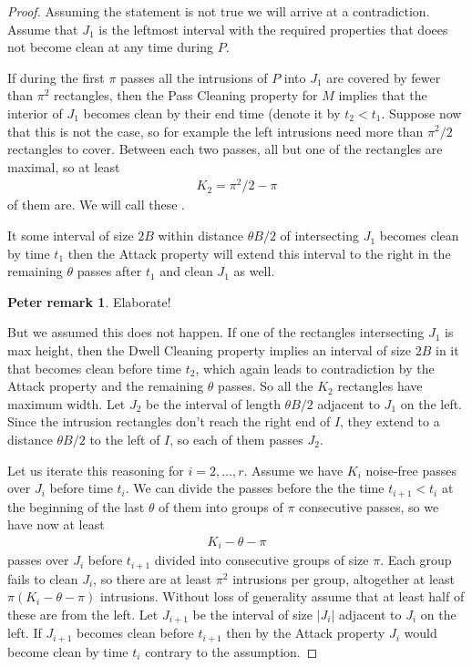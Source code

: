 \documentclass[11pt]{memoir}
\newcommand{\authnote}[3]
{\text{{ \textcolor{#3}{\( \langle\hspace{-0.2em}\langle \)\textsf{\footnotesize #1: #2}\( \rangle\hspace{-0.2em}\rangle \)}}}}
\newcommand{\authnote}[2]{}
\newcommand{\Pnote}[1]{{\authnote{P}{#1}{cyan}}}
\theoremstyle{definition} %
\newtheorem{Premark}{\color{cyan}Peter remark}
\newenvironment{premark}{\begin{Premark}\color{cyan}}{\varqed\end{Premark}}
\renewcommand{\Pnote}[1]{\begin{premark}#1\end{premark}}
\def\B{B}
\newcommand{\passno}{\pi}
\begin{document}
\begin{proof}
  Assuming the statement is not true we will arrive at a contradiction.
  Assume that \( J_{1} \) is the leftmost interval with the required properties that doees not become clean
  at any time during \( P \).
  
If during the first \( \passno \) passes
all the intrusions of \( P \) into \( J_{1} \) are covered by fewer than \( \passno^{2} \) rectangles,
then the Pass Cleaning property for \( M \) implies that the interior of
\( J_{1} \) becomes clean by their end time (denote it by \( t_{2}<t_{1} \).
Suppose now that this is not the case, so for example the left intrusions need more than \( \passno^{2}/2 \)
rectangles to cover.
Between each two passes, all but one of the rectangles are maximal, so at least
\begin{align*}
 K_{2}=\passno^{2}/2 -\passno
\end{align*}
of them are.
We will call these .

It some interval of size \( 2\B \) within distance \( \theta\B/2 \)
of intersecting \( J_{1} \) becomes clean by time \( t_{1} \) then the Attack property 
will extend this interval to the right in the remaining \( \theta \) passes after \( t_{1} \)
and clean \( J_{1} \) as well.
\Pnote{Elaborate!}
But we assumed this does not happen.
If one of the rectangles intersecting \( J_{1} \) is max height,
then the Dwell Cleaning property implies an interval of size \( 2\B \) in it that becomes
clean before time \( t_{2} \),
which again leads to contradiction by the Attack property and the remaining \( \theta \) passes.
So all the \( K_{2} \) rectangles have maximum width.
Let \( J_{2} \) be the interval of length \( \theta\B/2 \) adjacent to \( J_{1} \) on the left.
Since the intrusion rectangles
don't reach the right end of \( I \), they extend to a distance \( \theta\B/2 \) to the left
of \( I \), so each of them passes \( J_{2} \).

Let us iterate this reasoning for \( i=2,\dots,r \).
Assume we have \( K_{i} \) noise-free passes over \( J_{i} \) before time \( t_{i} \).
We can divide the passes before the the time \( t_{i+1}<t_{i} \) at the beginning of
the last \( \theta \) of them
into groups of \( \passno \) consecutive passes, so we have now at least
\begin{align*}
   K_{i}-\theta-\passno
\end{align*}
passes over \( J_{i} \) before \( t_{i+1} \) divided into consecutive groups of size \( \passno \).
Each group fails to clean \( J_{i} \), so there are at least \( \passno^{2} \) intrusions per group,
altogether at least \( \passno(K_{i}-\theta-\passno) \) intrusions.
Without loss of generality assume that at least half of these are from the left.
Let \( J_{i+1} \) be the interval of size \( |J_{i}| \) adjacent to \( J_{i} \) on the left.
If \( J_{i+1} \) becomes clean before \( t_{i+1} \) then by the Attack property \( J_{i} \) would become
clean by time \( t_{i} \) contrary to the assumption.


\end{proof}
\end{document}
